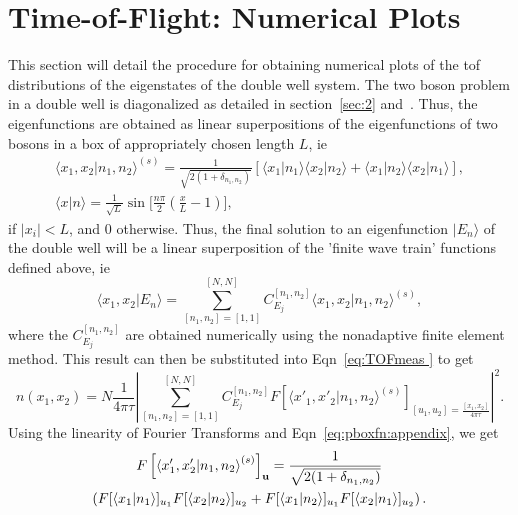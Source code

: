 \documentclass{article}
\begin{document}
\section{ Time-of-Flight: Numerical Plots}
\label{sec:4 }
This section will detail the procedure for obtaining numerical plots of the tof distributions of the eigenstates of the double well system. The two boson problem in a double well is diagonalized as detailed in section~\ref{sec:2} and~\cite{mypaper}. Thus, the eigenfunctions are obtained as linear superpositions of the eigenfunctions of two bosons in a box of appropriately chosen length $L$, ie
\begin{eqnarray}
{\langle}x_1,x_2\vert n_1,n_2{\rangle} ^{(s)}=\frac{1}{\sqrt{2(1+\delta_{n_1,n_2})}} 
[{\langle}x_1|n_1\rangle{\langle}x_2|n_2\rangle +{\langle}x_1|n_2\rangle{\langle}x_2|n_1\rangle ], \nonumber \\
\langle x|n\rangle=\frac{1}{\sqrt{L}} \sin{\biggl[}{\frac{n\pi}{2}(\frac{x}{L}-1){\biggr]}},
\label{eq:pboxfn:appendix}
\end{eqnarray}
 if $|x_i|<L$, and $0$ otherwise. Thus, the final solution to an eigenfunction $|E_n\rangle$ of the double well will be a linear superposition of the  'finite wave train'  functions defined above, ie
\begin{equation}
\langle x_1,x_2|E_n\rangle =  \sum_{\left[n_1,n_2\right]=\left[1,1\right]}^{\left[ N,N \right]} C^{\left[n_1,n_2 \right]}_{E_j} {\langle}x_1,x_2\vert n_1,n_2{\rangle} ^{(s)},
\end{equation}
where the $C^{\left[n_1,n_2 \right]}_{E_j}$ are obtained numerically using the nonadaptive finite element method. This result can then be substituted into Eqn~\ref{eq:TOFmeas } to get
\begin{equation}
n(x_1,x_2) = N \frac{1}{4\pi\tau} |\sum_{\left[n_1,n_2\right]=\left[1,1\right]}^{\left[ N,N \right]} C^{\left[n_1,n_2 \right]}_{E_j} F\left[ {\langle}x'_1,x'_2\vert n_1,n_2{\rangle} ^{(s)} \right]_{\left[u_1,u_2\right]=\frac{\left[ x_1,x_2 \right]}{4\pi\tau}}|^2.
\label{eq:density:appendix}
\end{equation}
Using the linearity of Fourier Transforms and Eqn~\ref{eq:pboxfn:appendix}, we get
\begin{multline}
F\left[ {\langle}x'_1,x'_2\vert n_1,n_2{\rangle} ^{(s)} \right]_{\bf u}=\frac{1}{\sqrt{2(1+\delta_{n_1,n_2})}}\\
\left( F[{\langle}x_1|n_1\rangle]_{u_1} F[{\langle}x_2|n_2\rangle]_{u_2} +F[{\langle}x_1|n_2\rangle]_{u_1} F[{\langle}x_2|n_1\rangle]_{u_2}  \right).
\label{eq:ft:appendix}
\end{multline}
\end{document}
